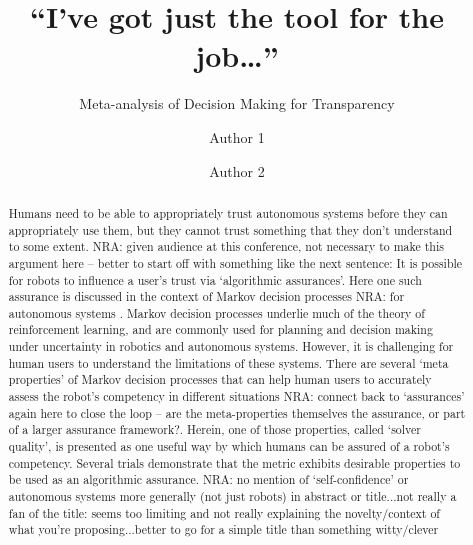 \documentclass[sigconf,authordraft]{acmart}
\newcommand{\hlr}[1]{{\color{red} #1}}
\newcommand{\nisar}[1]{\hlr{NRA: #1}}
\begin{document}
\title{``I've got just the tool for the job\ldots''}
\subtitle{Meta-analysis of Decision Making for Transparency}
\author{Author 1}
\author{Author 2}
\begin{abstract}
    Humans need to be able to appropriately trust autonomous systems before they can appropriately use them, but they cannot trust something that they don't understand to some extent. \nisar{given audience at this conference, not necessary to make this argument here -- better to start off with something like the next sentence:} It is possible for robots to influence a user's trust via `algorithmic assurances'. Here one such assurance is discussed in the context of Markov decision processes \nisar{for autonomous systems} . Markov decision processes underlie much of the theory of reinforcement learning, and are commonly used for planning and decision making under uncertainty in robotics and autonomous systems. However, it is challenging for human users to understand the limitations of these systems. There are several `meta properties' of Markov decision processes that can help human users to accurately assess the robot's competency in different situations \nisar{connect back to `assurances' again here to close the loop -- are the meta-properties themselves the assurance, or part of a larger assurance framework?}. Herein, one of those properties, called `solver quality', is presented as one useful way by which humans can be assured of a robot's competency. Several trials demonstrate that the metric exhibits desirable properties to be used as an algorithmic assurance. \nisar{no mention of `self-confidence' or autonomous systems more generally (not just robots) in abstract or title...not really a fan of the title: seems too limiting and not really explaining the novelty/context of what you're proposing...better to go for a simple title than something witty/clever}
\end{abstract}
\maketitle








\end{document}
